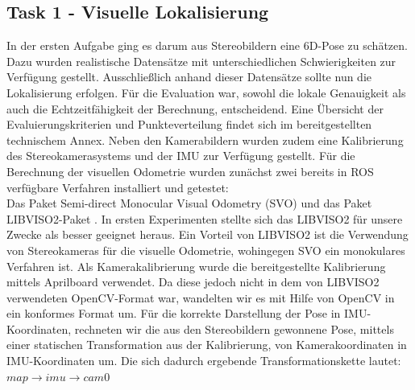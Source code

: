 \documentclass[12pt,titlepage, a4paper]{article}
\begin{document}
\subsection{Task 1 - Visuelle Lokalisierung}
In der ersten Aufgabe ging es darum aus Stereobildern eine 6D-Pose zu schätzen. Dazu wurden realistische Datensätze mit unterschiedlichen Schwierigkeiten zur Verfügung gestellt.
Ausschließlich anhand dieser Datensätze sollte nun die Lokalisierung erfolgen. Für die Evaluation war, sowohl die lokale Genauigkeit als auch die Echtzeitfähigkeit der Berechnung, entscheidend.
Eine Übersicht der Evaluierungskriterien und Punkteverteilung findet sich im bereitgestellten technischem Annex\cite{eurocannex}.
Neben den Kamerabildern wurden zudem eine Kalibrierung des Stereokamerasystems und der IMU zur Verfügung gestellt. 
Für die Berechnung der visuellen Odometrie wurden zunächst zwei bereits in ROS verfügbare Verfahren installiert und getestet:\\
Das Paket Semi-direct Monocular Visual Odometry (SVO)\cite{EPFL-CONF-199740} und das Paket \mbox{LIBVISO2}-Paket \cite{Geiger11}.
In ersten Experimenten stellte sich das \mbox{LIBVISO2} für unsere Zwecke als besser geeignet heraus. Ein Vorteil von LIBVISO2 ist die Verwendung von Stereokameras für die visuelle Odometrie, wohingegen SVO ein monokulares Verfahren ist.
Als Kamerakalibrierung wurde die bereitgestellte Kalibrierung mittels Aprilboard verwendet. Da diese jedoch nicht in dem von \mbox{LIBVISO2} verwendeten OpenCV-Format war, wandelten wir es mit Hilfe von OpenCV
in ein konformes Format um.
Für die korrekte Darstellung der Pose in IMU-Koordinaten, rechneten wir die aus den Stereobildern gewonnene Pose, mittels einer statischen Transformation aus der Kalibrierung, von Kamerakoordinaten 
in IMU-Koordinaten um.
Die sich dadurch ergebende Transformationskette lautet:\\

$  map \rightarrow imu \rightarrow cam0 $\\
\end{document}
